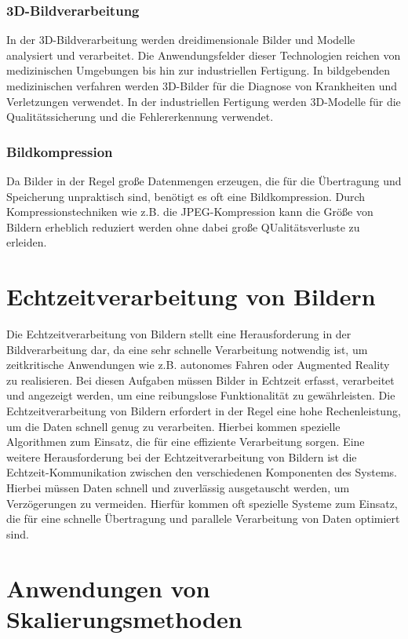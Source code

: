 \subsubsection{3D-Bildverarbeitung}
In der 3D-Bildverarbeitung werden dreidimensionale Bilder und Modelle analysiert und verarbeitet.
Die Anwendungsfelder dieser Technologien reichen von medizinischen Umgebungen bis hin zur industriellen Fertigung.
In bildgebenden medizinischen verfahren werden 3D-Bilder für die Diagnose von Krankheiten und Verletzungen verwendet. 
In der industriellen Fertigung werden 3D-Modelle für die Qualitätssicherung und die Fehlererkennung verwendet.

\subsubsection{Bildkompression}
Da Bilder in der Regel große Datenmengen erzeugen, die für die Übertragung und Speicherung unpraktisch sind, benötigt es oft eine Bildkompression. 
Durch Kompressionstechniken wie z.B. die JPEG-Kompression kann die Größe von Bildern erheblich reduziert werden ohne dabei große QUalitätsverluste zu erleiden.

\section{Echtzeitverarbeitung von Bildern}

Die Echtzeitverarbeitung von Bildern stellt eine Herausforderung in der Bildverarbeitung dar, da eine sehr schnelle Verarbeitung notwendig ist, um zeitkritische Anwendungen wie z.B. autonomes Fahren oder Augmented Reality zu realisieren.
Bei diesen Aufgaben müssen Bilder in Echtzeit erfasst, verarbeitet und angezeigt werden, um eine reibungslose Funktionalität zu gewährleisten.
Die Echtzeitverarbeitung von Bildern erfordert in der Regel eine hohe Rechenleistung, um die Daten schnell genug zu verarbeiten.
Hierbei kommen spezielle Algorithmen zum Einsatz, die für eine effiziente Verarbeitung sorgen.
Eine weitere Herausforderung bei der Echtzeitverarbeitung von Bildern ist die Echtzeit-Kommunikation zwischen den verschiedenen Komponenten des Systems. Hierbei müssen Daten schnell und zuverlässig ausgetauscht werden, um Verzögerungen zu vermeiden. 
Hierfür kommen oft spezielle Systeme zum Einsatz, die für eine schnelle Übertragung und parallele Verarbeitung von Daten optimiert sind.
\section{Anwendungen von Skalierungsmethoden}
\newpage
